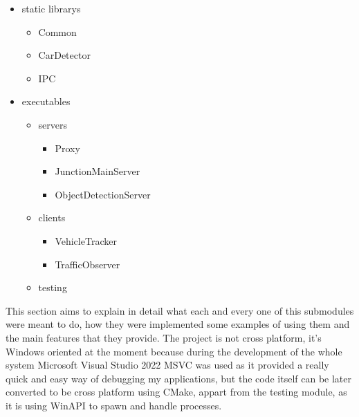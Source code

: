 \documentclass[17pt]{report}
\begin{document}
\begin{itemize}
    \item static librarys
    \begin{itemize}
        \item Common
        \item CarDetector
        \item IPC
    \end{itemize}
    
    \item executables
    \begin{itemize}
        \item servers
        \begin{itemize}
            \item Proxy
            \item JunctionMainServer
            \item ObjectDetectionServer
        \end{itemize}
        \item  clients
        \begin{itemize}
            \item VehicleTracker
            \item TrafficObserver
        \end{itemize}
        \item testing
    \end{itemize}
\end{itemize}

This section aims to explain in detail what each and every one of this submodules were meant to do,
how they were implemented some examples of using them and the main features that they
provide. The project is not cross platform, it's Windows oriented at the moment because
during the development of the whole system Microsoft Visual Studio 2022 MSVC was used
as it provided a really quick and easy way of debugging my applications, but 
the code itself can be later converted to be cross platform using CMake, appart from
the testing module, as it is using WinAPI to spawn and handle processes. 


\pagebreak
\end{document}
